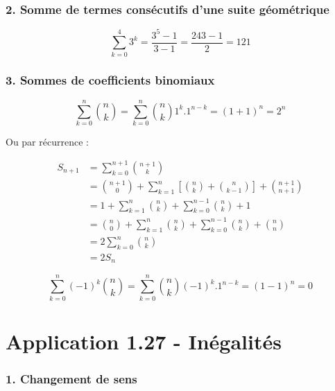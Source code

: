\documentclass{report}
\begin{document}
\subsubsection*{2. Somme de termes consécutifs d'une suite géométrique}
\begin{displaymath}
\sum_{k = 0}^{4} 3^k = \frac{3^5-1}{3-1}=\frac{243-1}{2}=121
\end{displaymath}


\subsubsection*{3. Sommes de coefficients binomiaux} 
\begin{displaymath}
	\sum_{k = 0}^{n} \binom{n}{k} = \sum_{k = 0}^{n} \binom{n}{k} 1^k . 1^{n-k} = (1+1)^n = 2^n
\end{displaymath}

Ou par récurrence :

\begin{equation*}
	\begin{split}
		S_{n+1} &= \sum_{k = 0}^{n+1} \binom{n+1}{k} \\
		        &= \binom{n+1}{0} + \sum_{k = 1}^{n} \left[ \binom{n}{k} + \binom{n}{k-1}\right] + \binom{n+1}{n+1}\\ 
		        &= 1 + \sum_{k = 1}^{n} \binom{n}{k} + \sum_{k = 0}^{n-1} \binom{n}{k} + 1 \\
		        &= \binom{n}{0} + \sum_{k = 1}^{n} \binom{n}{k} + \sum_{k = 0}^{n-1} \binom{n}{k} + \binom{n}{n} \\
		        &= 2 \sum_{k = 0}^{n} \binom{n}{k} \\
		        &= 2S_n      
	\end{split}
\end{equation*}

\begin{displaymath}
	\sum_{k = 0}^{n} (-1)^k \binom{n}{k} = \sum_{k = 0}^{n} \binom{n}{k} (-1)^k . 1^{n-k} = (1-1)^n = 0
\end{displaymath}


\section*{Application 1.27 - Inégalités}

\subsubsection*{1. Changement de sens}
\end{document}
